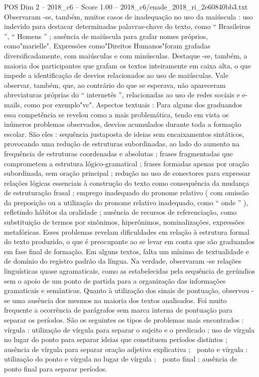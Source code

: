 \begin{textsample}{POS Dim 2 – 2018\_c6 – Score 1.00 – 2018\_c6/enade\_2018\_ri\_2e60840bb3.txt}
Observaram -se, também, muitos casos de inadequação no uso da maiúscula : uso indevido para destacar determinadas palavras-chave do texto, como “ Brasileiros ”, “ Homens ” ; ausência de maiúscula para grafar nomes próprios, como"marielle".
Expressões como"Direitos Humanos"foram grafadas diversificadamente, com maiúsculas e com minúsculas.
Destaque -se, também, a maioria dos participantes que grafam os textos inteiramente em caixa alta, o que impede a identificação de desvios relacionados ao uso de maiúsculas.
Vale observar, também, que, ao contrário do que se esperava, não apareceram abreviaturas próprias do “ internetês ”, relacionadas ao uso de redes sociais e e-mails, como por exemplo"vc".
Aspectos textuais : Para alguns dos graduandos essa competência se revelou como a mais problemática, tendo em vista os inúmeros problemas observados, desvios acumulados durante toda a formação escolar.
São eles : sequência justaposta de ideias sem encaixamentos sintáticos, provocando uma redução de estruturas subordinadas, ao lado do aumento na frequência de estruturas coordenadas e absolutas ; frases fragmentadas que comprometem a estrutura lógico-gramatical ; frases formadas apenas por oração subordinada, sem oração principal ; redução no uso de conectores para expressar relações lógicas essenciais à construção do texto como consequência da mudança de estruturação frasal ; emprego inadequado do pronome relativo ( com omissão da preposição ou a utilização do pronome relativo inadequado, como “ onde ” ), refletindo hábitos da oralidade ; ausência de recursos de referenciação, como substituição de termos por sinônimos, hiperônimos, nominalizações, expressões metafóricas.
Esses problemas revelam dificuldades em relação à estrutura formal do texto produzido, o que é preocupante ao se levar em conta que são graduandos em fase final de formação.
Em alguns textos, falta um mínimo de textualidade e de domínio do registro padrão da língua.
Na verdade, observaram -se relações linguísticas quase agramaticais, como as estabelecidas pela sequência de gerúndios sem o apoio de um ponto de partida para a organização das informações gramaticais e semânticas.
Quanto à utilização dos sinais de pontuação, observou -se uma ausência dos mesmos na maioria dos textos analisados.
Foi muito frequente a ocorrência de parágrafos sem marca interna de pontuação para separar os períodos.
São os seguintes os tipos de problemas mais encontrados :  vírgula : utilização de vírgula para separar o sujeito e o predicado ; uso de vírgula no lugar do ponto para separar ideias que constituem períodos distintos ; ausência de vírgula para separar oração adjetiva explicativa ;  ponto e vírgula : utilização do ponto e vírgula no lugar de vírgula ;  ponto final : ausência de ponto final para separar períodos.

\end{textsample}
